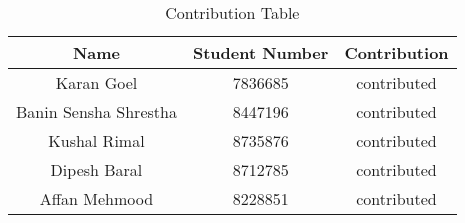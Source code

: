 \begin{contribution}
    \vspace{3cm}
    \begin{table}[h]
        \centering
        \Large
        \caption{Contribution Table}
        \vspace{0.4cm}
        \begin{tabular}{|c|c|c|}
        \hline
        \textbf{Name} & \textbf{ Student Number } & \textbf{ Contribution } \\
        \hline
        Karan Goel & 7836685 & contributed \\
        Banin Sensha Shrestha & 8447196 & contributed \\
        Kushal Rimal & 8735876 & contributed \\
        Dipesh Baral & 8712785 & contributed \\
        Affan Mehmood & 8228851 & contributed \\
        \hline
        \end{tabular}
        \label{tab:contribution}
    \end{table}
    
\end{contribution}